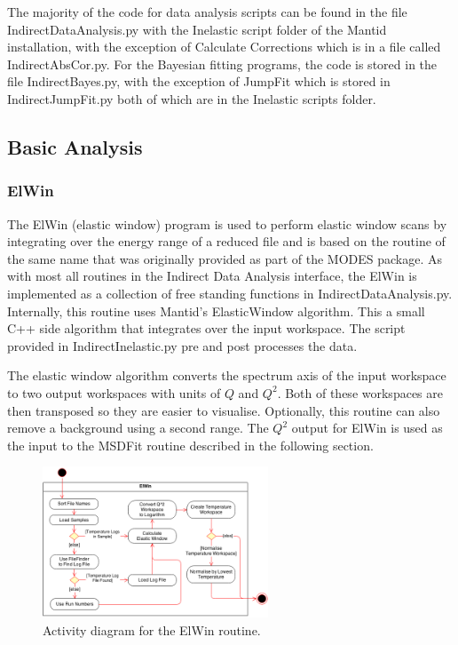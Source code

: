 \documentclass[paper=a4, fontsize=11pt]{scrartcl}	%
\numberwithin{equation}{section}															%
\numberwithin{figure}{section}																%
\numberwithin{table}{section}																%
\begin{document}
The majority of the code for data analysis scripts can be found in the file IndirectDataAnalysis.py with the Inelastic script folder of the Mantid installation, with the exception of Calculate Corrections which is in a file called IndirectAbsCor.py. For the Bayesian fitting programs, the code is stored in the file IndirectBayes.py, with the exception of JumpFit which is stored in IndirectJumpFit.py both of which are in the Inelastic scripts folder.

\subsection{Basic Analysis}
\subsubsection{ElWin}
The ElWin (elastic window) program is used to perform elastic window scans by integrating over the energy range of a reduced file and is based on the routine of the same name that was originally provided as part of the MODES package. As with most all routines in the Indirect Data Analysis interface, the ElWin is implemented as a collection of free standing functions in IndirectDataAnalysis.py. Internally, this routine uses Mantid's ElasticWindow algorithm. This a small C++ side algorithm that integrates over the input workspace. The script provided in IndirectInelastic.py pre and post processes the data. 

The elastic window algorithm converts the spectrum axis of the input workspace to two output workspaces with units of $Q$ and $Q^2$. Both of these workspaces are then transposed so they are easier to visualise. Optionally, this routine can also remove a background using a second range. The $Q^2$ output for ElWin is used as the input to the MSDFit routine described in the following section.

\begin{figure}[H]
\centering
\includegraphics[width=0.6\textwidth]{img/uml/activity_diagrams/ElWin_activity.png}
\caption{Activity diagram for the ElWin routine.}
\label{fig:elwin-acticity-diagram}
\end{figure}
\end{document}
